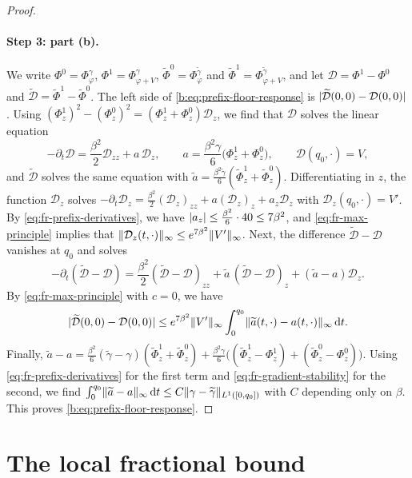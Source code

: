 \begin{proof}
\paragraph{Step 3: part (b).} We write $\Phi^0=\Phi^\gamma_\varphi$, $\Phi^1=\Phi^\gamma_{\varphi+V}$, $\widetilde\Phi^0=\Phi^{\widetilde\gamma}_\varphi$ and $\widetilde\Phi^1=\Phi^{\widetilde\gamma}_{\varphi+V}$, and let $\mathcal D=\Phi^1-\Phi^0$ and $\widetilde{\mathcal D}=\widetilde\Phi^1-\widetilde\Phi^0$. The left side of \eqref{b:eq:prefix-floor-response} is $\lvert \widetilde{\mathcal D}(0,0)-\mathcal D(0,0)\rvert$. Using $(\Phi^1_z)^2-(\Phi^0_z)^2=(\Phi^1_z+\Phi^0_z)\mathcal D_z$, we find that $\mathcal D$ solves the linear equation
\[
 -\partial_t\mathcal D=\frac{\beta^2}2\mathcal D_{zz}+a\,\mathcal D_z,\qquad
 a=\frac{\beta^2\gamma}6\bigl(\Phi^1_z+\Phi^0_z\bigr),\qquad\mathcal D(q_0,\cdot)=V,
\]
and $\widetilde{\mathcal D}$ solves the same equation with $\widetilde a=\frac{\beta^2\widetilde\gamma}6(\widetilde\Phi^1_z+\widetilde\Phi^0_z)$. Differentiating in $z$, the function $\mathcal D_z$ solves $-\partial_t\mathcal D_z=\frac{\beta^2}2(\mathcal D_z)_{zz}+a(\mathcal D_z)_z+a_z\mathcal D_z$ with $\mathcal D_z(q_0,\cdot)=V'$. By \eqref{eq:fr-prefix-derivatives}, we have $\lvert a_z\rvert\le\frac{\beta^2}6\cdot40\le7\beta^2$, and \eqref{eq:fr-max-principle} implies that $\lVert \mathcal D_z(t,\cdot)\rVert_\infty\le e^{7\beta^2}\lVert V'\rVert_\infty$. Next, the difference $\widetilde{\mathcal D}-\mathcal D$ vanishes at $q_0$ and solves
\[
 -\partial_t(\widetilde{\mathcal D}-\mathcal D)=\frac{\beta^2}2(\widetilde{\mathcal D}-\mathcal D)_{zz}+\widetilde a\,(\widetilde{\mathcal D}-\mathcal D)_z+(\widetilde a-a)\mathcal D_z.
\]
By \eqref{eq:fr-max-principle} with $c=0$, we have
\[
 \lvert \widetilde{\mathcal D}(0,0)-\mathcal D(0,0)\rvert\le e^{7\beta^2}\lVert V'\rVert_\infty\int_0^{q_0}\lVert \widetilde a(t,\cdot)-a(t,\cdot)\rVert_\infty\,\mathrm d t.
\]
Finally, $\widetilde a-a=\frac{\beta^2}6(\widetilde\gamma-\gamma)(\widetilde\Phi^1_z+\widetilde\Phi^0_z)+\frac{\beta^2\gamma}6\bigl((\widetilde\Phi^1_z-\Phi^1_z)+(\widetilde\Phi^0_z-\Phi^0_z)\bigr)$. Using \eqref{eq:fr-prefix-derivatives} for the first term and \eqref{eq:fr-gradient-stability} for the second, we find $\int_0^{q_0}\lVert \widetilde a-a\rVert_\infty\,\mathrm d t\le C\lVert \gamma-\widetilde\gamma\rVert_{L^1([0,q_0])}$ with $C$ depending only on $\beta$. This proves \eqref{b:eq:prefix-floor-response}.
\end{proof}

\section{The local fractional bound}\label{sec:fr-local}

